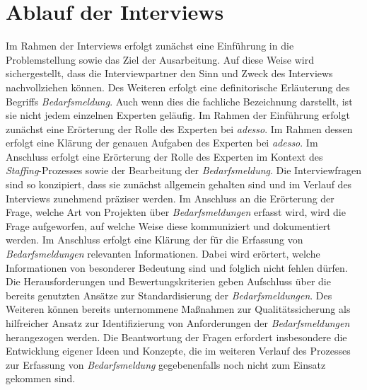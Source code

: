 \section{Ablauf der Interviews}
\label{sec:ablaufexperteninterviews}
Im Rahmen der Interviews erfolgt zunächst eine Einführung in die Problemstellung sowie das Ziel der Ausarbeitung. Auf diese Weise wird sichergestellt, dass die Interviewpartner den Sinn und Zweck des Interviews nachvollziehen können. Des Weiteren erfolgt eine definitorische Erläuterung des Begriffs \emph{Bedarfsmeldung}. Auch wenn dies die fachliche Bezeichnung darstellt, ist sie nicht jedem einzelnen Experten geläufig. Im Rahmen der Einführung erfolgt zunächst eine Erörterung der Rolle des Experten bei \emph{adesso}. Im Rahmen dessen erfolgt eine Klärung der genauen Aufgaben des Experten bei \emph{adesso}. Im Anschluss erfolgt eine Erörterung der Rolle des Experten im Kontext des \emph{Staffing}-Prozesses sowie der Bearbeitung der \emph{Bedarfsmeldung}. Die Interviewfragen sind so konzipiert, dass sie zunächst allgemein gehalten sind und im Verlauf des Interviews zunehmend präziser werden. Im Anschluss an die Erörterung der Frage, welche Art von Projekten über \emph{Bedarfsmeldungen} erfasst wird, wird die Frage aufgeworfen, auf welche Weise diese kommuniziert und dokumentiert werden. Im Anschluss erfolgt eine Klärung der für die Erfassung von \emph{Bedarfsmeldungen} relevanten Informationen. Dabei wird erörtert, welche Informationen von besonderer Bedeutung sind und folglich nicht fehlen dürfen. Die Herausforderungen und Bewertungskriterien geben Aufschluss über die bereits genutzten Ansätze zur Standardisierung der \emph{Bedarfsmeldungen}. Des Weiteren können bereits unternommene Maßnahmen zur Qualitätssicherung als hilfreicher Ansatz zur Identifizierung von Anforderungen der \emph{Bedarfsmeldungen} herangezogen werden. Die Beantwortung der Fragen erfordert insbesondere die Entwicklung eigener Ideen und Konzepte, die im weiteren Verlauf des Prozesses zur Erfassung von \emph{Bedarfsmeldung} gegebenenfalls noch nicht zum Einsatz gekommen sind.
